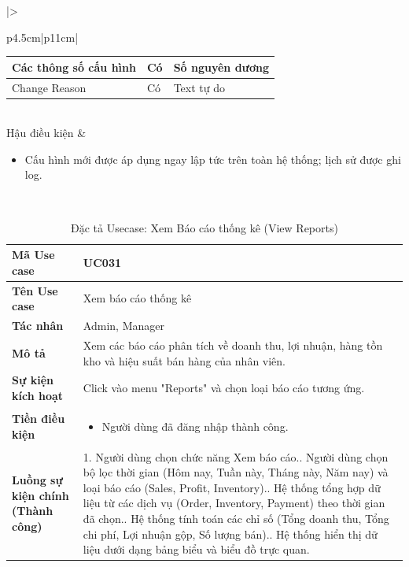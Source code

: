 \documentclass[12pt,a4paper]{report}
\begin{document}
\begin{longtable}{|>{\raggedright\arraybackslash\bfseries}p{4.5cm}|p{11cm}|}
\begin{tabular}{|p{3.5cm}|p{2.5cm}|p{4cm}|}
Các thông số cấu hình & Có & Số nguyên dương \\ \hline
Change Reason & Có & Text tự do \\ \hline
\end{tabular} \\ \hline
Hậu điều kiện & 
\begin{itemize}[leftmargin=*, nosep, topsep=0pt, partopsep=0pt]
    \item Cấu hình mới được áp dụng ngay lập tức trên toàn hệ thống; lịch sử được ghi log.
\end{itemize} \\ \hline
\end{longtable}

\vspace{0.5cm}

\begin{longtable}{|>{\raggedright\arraybackslash\bfseries}p{4.5cm}|p{11cm}|}
\caption{Đặc tả Usecase: Xem Báo cáo thống kê (View Reports)} \label{tab:uc_031} \\
\hline
Mã Use case & UC031 \\ \hline
Tên Use case & Xem báo cáo thống kê \\ \hline
Tác nhân & Admin, Manager \\ \hline
Mô tả & Xem các báo cáo phân tích về doanh thu, lợi nhuận, hàng tồn kho và hiệu suất bán hàng của nhân viên. \\ \hline
Sự kiện kích hoạt & Click vào menu "Reports" và chọn loại báo cáo tương ứng. \\ \hline
Tiền điều kiện & 
\begin{itemize}[leftmargin=*, nosep, topsep=0pt, partopsep=0pt]
    \item Người dùng đã đăng nhập thành công.
\end{itemize} \\ \hline
Luồng sự kiện chính (Thành công) & 
1. Người dùng chọn chức năng Xem báo cáo.\newline
2. Người dùng chọn bộ lọc thời gian (Hôm nay, Tuần này, Tháng này, Năm nay) và loại báo cáo (Sales, Profit, Inventory).\newline
3. Hệ thống tổng hợp dữ liệu từ các dịch vụ (Order, Inventory, Payment) theo thời gian đã chọn.\newline
4. Hệ thống tính toán các chỉ số (Tổng doanh thu, Tổng chi phí, Lợi nhuận gộp, Số lượng bán).\newline
5. Hệ thống hiển thị dữ liệu dưới dạng bảng biểu và biểu đồ trực quan. \\ \hline

\end{longtable}
\end{document}
